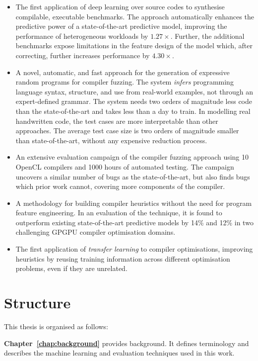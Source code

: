 \begin{itemize}
  \item The first application of deep learning over source codes to synthesise compilable, executable benchmarks. The approach automatically enhances the predictive power of a state-of-the-art predictive model, improving the performance of heterogeneous workloads by $1.27\times$. Further, the additional benchmarks expose limitations in the feature design of the model which, after correcting, further increases performance by $4.30\times$.
  \item A novel, automatic, and fast approach for the generation of expressive random programs for compiler fuzzing. The system \emph{infers} programming language syntax, structure, and use from real-world examples, not through an expert-defined grammar. The system needs two orders of magnitude less code than the state-of-the-art and takes less than a day to train. In modelling real handwritten code, the test cases are more interpretable than other approaches. The average test case size is two orders of magnitude smaller than state-of-the-art, without any expensive reduction process.
  \item An extensive evaluation campaign of the compiler fuzzing approach using 10 OpenCL compilers and 1000 hours of automated testing. The campaign uncovers a similar number of bugs as the state-of-the-art, but also finds bugs which prior work cannot, covering more components of the compiler.
	\item A methodology for building compiler heuristics without the need for program feature engineering. In an evaluation of the technique, it is found to outperform existing state-of-the-art predictive models by 14\% and 12\% in two challenging GPGPU compiler optimisation domains.
	\item The first application of \emph{transfer learning} to compiler optimisations, improving heuristics by reusing training information across different optimisation problems, even if they are unrelated.
\end{itemize}

\newpage
\section{Structure}

This thesis is organised as follows:

\textbf{Chapter~\ref{chap:background}} provides background. It defines terminology and describes the machine learning and evaluation techniques used in this work.

